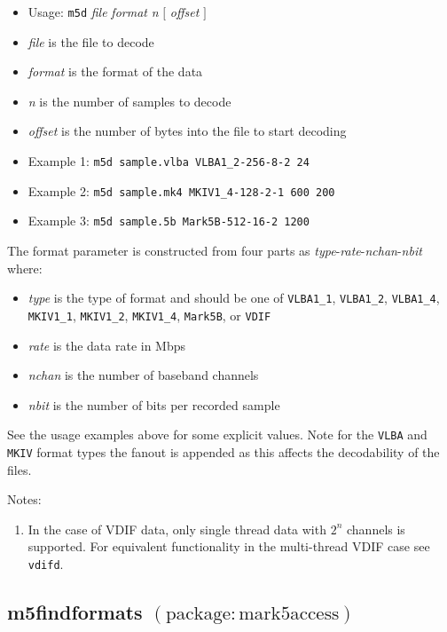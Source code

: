 \begin{itemize}
\item[] Usage: {\tt m5d} {\em file} {\em format} {\em n} $[$ {\em offset} $]$ 
\item[] {\em file} is the file to decode
\item[] {\em format} is the format of the data
\item[] {\em n} is the number of samples to decode
\item[] {\em offset} is the number of bytes into the file to start decoding
\item[] Example 1: {\tt m5d sample.vlba VLBA1\_2-256-8-2 24}
\item[] Example 2: {\tt m5d sample.mk4 MKIV1\_4-128-2-1 600 200} 
\item[] Example 3: {\tt m5d sample.5b Mark5B-512-16-2 1200}
\end{itemize}

The format parameter is constructed from four parts as {\em type}-{\em rate}-{\em nchan}-{\em nbit} where:
\begin{itemize}
\item[] {\em type} is the type of format and should be one of {\tt VLBA1\_1}, {\tt VLBA1\_2}, {\tt VLBA1\_4}, {\tt MKIV1\_1}, {\tt MKIV1\_2}, {\tt MKIV1\_4}, {\tt Mark5B}, or {\tt VDIF}
\item[] {\em rate} is the data rate in Mbps
\item[] {\em nchan} is the number of baseband channels
\item[] {\em nbit} is the number of bits per recorded sample
\end{itemize}
See the usage examples above for some explicit values.
Note for the {\tt VLBA} and {\tt MKIV} format types the fanout is appended as this affects the decodability of the files.

\noindent
Notes:
\begin{enumerate}
\item In the case of VDIF data, only single thread data with $2^n$ channels is supported.
For equivalent functionality in the multi-thread VDIF case see {\tt vdifd}.
\end{enumerate}





\subsection{m5findformats {\small $\mathrm{(package: mark5access)}$}} \label{sec:m5findformat}

